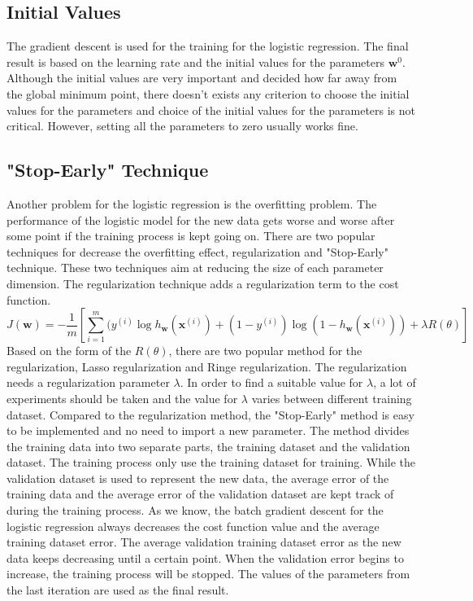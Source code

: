 \subsection{Initial Values}
The gradient descent is used for the training for the logistic regression. The final result is based on the learning rate and the initial values for the parameters $\textbf{w}^0$. Although the initial values are very important and decided how far away from the global minimum point, there doesn't exists any criterion to choose the initial values for the parameters and choice of the initial values for the parameters is not critical. However, setting all the parameters to zero usually works fine\cite{allison2008convergence}. 

\subsection{"Stop-Early" Technique}
Another problem for the logistic regression is the overfitting problem. The performance of the logistic model for the new data gets worse and worse after some point if the training process is kept going on. There are two popular techniques for decrease the overfitting effect, regularization and "Stop-Early" technique. These two techniques aim at reducing the size of each parameter dimension. The regularization technique adds a regularization term to the cost function.
\begin{equation}
J(\textbf{w})= - \frac{1}{m}[\sum_{i=1}^m (y^{(i)}\log h_\textbf{w}(\textbf{x}^{(i)}) +(1-y^{(i)})\log (1-h_\textbf{w}(\textbf{x}^{(i)}))+\lambda R(\theta)]
\end{equation} 
Based on the form of the $R(\theta)$,  there are two popular method for the regularization, Lasso regularization and Ringe regularization. The regularization needs a regularization parameter $\lambda$. In order to find a suitable value for $\lambda$, a lot of experiments should be taken and the value for $\lambda$ varies between different training dataset. Compared to the regularization method, the "Stop-Early" method is easy to be implemented and no need to import a new parameter. The method divides the training data into two separate parts, the training dataset and the validation dataset. The training process only use the training dataset for training. While the validation dataset is used to represent the new data, the average error of the training data and the average error of the validation dataset are kept track of during the training process. As we know, the batch gradient descent for the logistic regression  always decreases the cost function value and the average training dataset error. The average validation training dataset error as the new data  keeps decreasing until a certain point. When the validation error begins to increase, the training process will be stopped. The values of the parameters from the last iteration are used as the final result.
 
